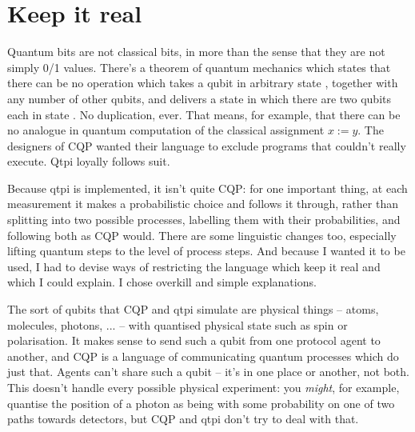\section{Keep it real}

Quantum bits are not classical bits, in more than the sense that they are not simply 0/1 values. There's a theorem of quantum mechanics which states that there can be no operation which takes a qubit in arbitrary state \bv{\phi}, together with any number of other qubits, and delivers a state in which there are two qubits each in state \bv{\phi}. No duplication, ever. That means, for example, that there can be no analogue in quantum computation of the classical assignment $x:=y$. The designers of CQP \citep{GaySJ:comqp} wanted their language to exclude programs that couldn't really execute. Qtpi loyally follows suit.

Because qtpi is implemented, it isn't quite CQP: for one important thing, at each measurement it makes a probabilistic choice and follows it through, rather than splitting into two possible processes, labelling them with their probabilities, and following both as CQP would. There are some linguistic changes too, especially lifting quantum steps to the level of process steps. And because I wanted it to be used, I had to devise ways of restricting the language which keep it real and which I could explain. I chose overkill and simple explanations. 

The sort of qubits that CQP and qtpi simulate are physical things -- atoms, molecules, photons, ... -- with quantised physical state such as spin or polarisation. It makes sense to send such a qubit from one protocol agent to another, and CQP is a language of communicating quantum processes which do just that. Agents can't share such a qubit -- it's in one place or another, not both. This doesn't handle every possible physical experiment: you \emph{might}, for example,  quantise the position of a photon as being with some probability on one of two paths towards detectors, but CQP and qtpi don't try to deal with that.

